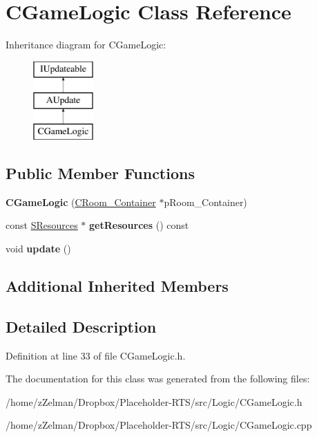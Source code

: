 \hypertarget{classCGameLogic}{\section{C\-Game\-Logic Class Reference}
\label{classCGameLogic}
}
Inheritance diagram for C\-Game\-Logic\-:\begin{figure}[H]
\begin{center}
\leavevmode
\includegraphics[height=3.000000cm]{classCGameLogic}
\end{center}
\end{figure}
\subsection*{Public Member Functions}
\begin{DoxyCompactItemize}
\item 
\hypertarget{classCGameLogic_ab32667a8e03199478e0170aad2cbd5f1}{{\bfseries C\-Game\-Logic} (\hyperlink{classCRoom__Container}{C\-Room\-\_\-\-Container} $\ast$p\-Room\-\_\-\-Container)}\label{classCGameLogic_ab32667a8e03199478e0170aad2cbd5f1}

\item 
\hypertarget{classCGameLogic_aa55d46e82f4a6e51de3dbb234d2ab940}{const \hyperlink{structSResources}{S\-Resources} $\ast$ {\bfseries get\-Resources} () const }\label{classCGameLogic_aa55d46e82f4a6e51de3dbb234d2ab940}

\item 
\hypertarget{classCGameLogic_a21e8fcd8ef9898522118ff66b8f13739}{void {\bfseries update} ()}\label{classCGameLogic_a21e8fcd8ef9898522118ff66b8f13739}

\end{DoxyCompactItemize}
\subsection*{Additional Inherited Members}


\subsection{Detailed Description}


Definition at line 33 of file C\-Game\-Logic.\-h.



The documentation for this class was generated from the following files\-:\begin{DoxyCompactItemize}
\item 
/home/z\-Zelman/\-Dropbox/\-Placeholder-\/\-R\-T\-S/src/\-Logic/C\-Game\-Logic.\-h\item 
/home/z\-Zelman/\-Dropbox/\-Placeholder-\/\-R\-T\-S/src/\-Logic/C\-Game\-Logic.\-cpp\end{DoxyCompactItemize}
